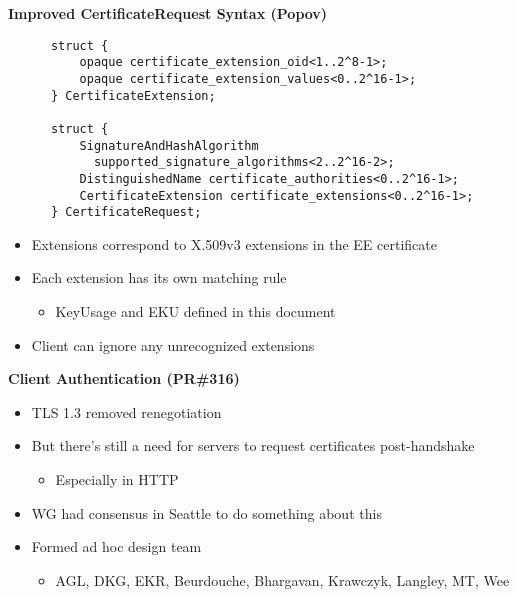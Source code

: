 \documentclass[helvetica]{seminar}
\newcommand{\heading}[1]{%
  \begin{center} 
    \large\bf 
    #1 
  \end{center} 
  \vspace{.4 in}}
\begin{document}
\begin{slide}
\heading{Improved CertificateRequest Syntax (Popov)}

\vspace{-3ex}
\begin{footnotesize}
\begin{verbatim}
      struct {
          opaque certificate_extension_oid<1..2^8-1>;
          opaque certificate_extension_values<0..2^16-1>;
      } CertificateExtension;

      struct {
          SignatureAndHashAlgorithm
            supported_signature_algorithms<2..2^16-2>;
          DistinguishedName certificate_authorities<0..2^16-1>;
          CertificateExtension certificate_extensions<0..2^16-1>;
      } CertificateRequest;
\end{verbatim}
\end{footnotesize}

\begin{itemize}
\item Extensions correspond to X.509v3 extensions in the EE certificate
\item Each extension has its own matching rule
  \begin{itemize}
  \item KeyUsage and EKU defined in this document
  \end{itemize}
\item Client can ignore any unrecognized extensions
\end{itemize}
\end{slide}


\begin{slide}
\heading{Client Authentication (PR\#316)}

\begin{itemize}
\item TLS 1.3 removed renegotiation
\item But there's still a need for servers to request certificates post-handshake
  \begin{itemize}
  \item Especially in HTTP
  \end{itemize}

\item WG had consensus in Seattle to do something about this
\item Formed ad hoc design team
  \begin{itemize}
  \item AGL, DKG, EKR, Beurdouche, Bhargavan, Krawczyk, Langley, MT, Wee
  \end{itemize}
\end{itemize}
\end{slide}
\end{document}
